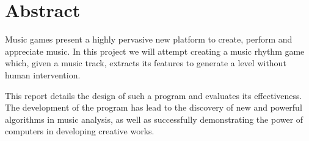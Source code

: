 
\chapter{Abstract} %

\label{Abstract} %


Music games present a highly pervasive new platform to create, perform and appreciate music. In this project we will attempt creating a music rhythm game which, given a music track, extracts its features to generate a level without human intervention.

This report details the design of such a program and evaluates its effectiveness. The development of the program has lead to the discovery of new and powerful algorithms in music analysis, as well as successfully demonstrating the power of computers in developing creative works.


